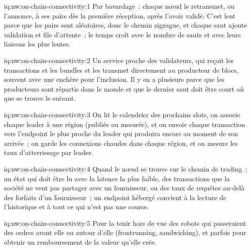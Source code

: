 \begin{solution}{iq:nw:on-chain-connectivity:1}
Par bavardage~: chaque nœud le retransmet, ou l'annonce, à ses pairs dès la première réception, après l'avoir validé. C'est lent parce que les pairs sont aléatoires, donc le
chemin zigzague, et chaque saut ajoute validation et file d'attente~; le temps croît avec le nombre de sauts et avec leurs liaisons les plus lentes.
\end{solution}

\begin{solution}{iq:nw:on-chain-connectivity:2}
Un service proche des validateurs, qui reçoit les transactions et les bundles et les transmet directement au producteur de blocs, souvent avec une enchère pour l'inclusion.
Il y en a plusieurs parce que les producteurs sont répartis dans le monde et que le dernier saut doit être court où que se trouve le suivant.
\end{solution}

\begin{solution}{iq:nw:on-chain-connectivity:3}
On lit le calendrier des prochains slots, on associe chaque leader à une région (publiée ou mesurée), et on envoie chaque transaction vers l'endpoint le plus proche du leader
qui produira encore au moment de son arrivée~; on garde les connexions chaudes dans chaque région, et on mesure les taux d'atterrissage par leader.
\end{solution}

\begin{solution}{iq:nw:on-chain-connectivity:4}
Quand le nœud se trouve sur le chemin de trading~: un état qui doit être lu avec la latence la plus faible, des transactions que la société ne veut pas partager avec un fournisseur,
ou des taux de requêtes au-delà des forfaits d'un fournisseur~; un endpoint hébergé convient à la lecture de l'historique et à tout ce qui n'est pas une course.
\end{solution}

\begin{solution}{iq:nw:on-chain-connectivity:5}
Pour la tenir hors de vue des robots qui passeraient des ordres avant elle ou autour d'elle (frontrunning, sandwiching), et parfois pour obtenir un remboursement de la valeur qu'elle crée.
\end{solution}

